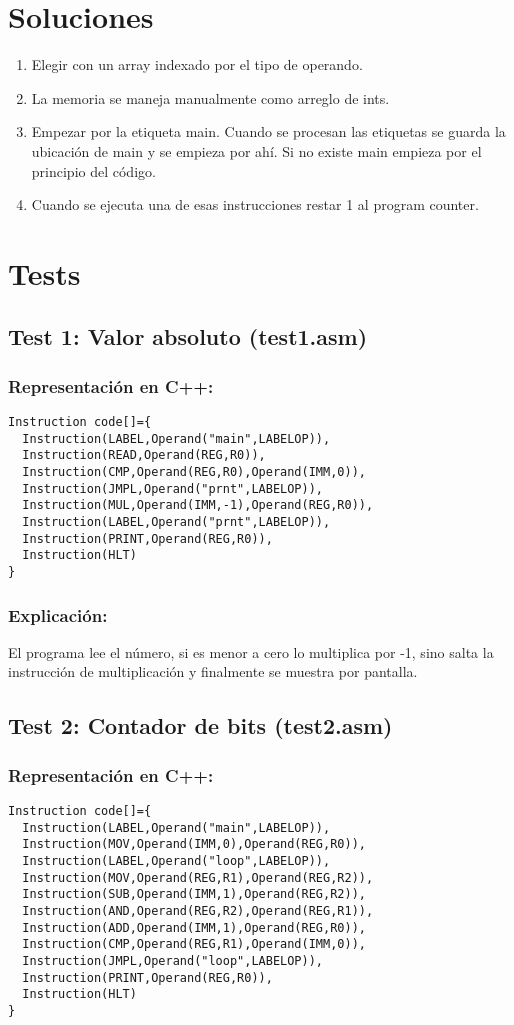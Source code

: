 \documentclass[12pt]{article}
\begin{document}
\section*{Soluciones}
\begin{enumerate}
\item Elegir con un array indexado por el tipo de operando.
\item La memoria se maneja manualmente como arreglo de ints.
\item Empezar por la etiqueta main. Cuando se procesan las etiquetas se guarda la ubicación de main y se empieza por ahí. Si no existe main empieza por el principio del código.
\item Cuando se ejecuta una de esas instrucciones restar 1 al program counter.  
\end{enumerate}
\section*{Tests}
\subsection*{Test 1: Valor absoluto (test1.asm)}
\subsubsection*{Representación en C++:}
\begin{verbatim}
Instruction code[]={
  Instruction(LABEL,Operand("main",LABELOP)),
  Instruction(READ,Operand(REG,R0)),
  Instruction(CMP,Operand(REG,R0),Operand(IMM,0)),
  Instruction(JMPL,Operand("prnt",LABELOP)),
  Instruction(MUL,Operand(IMM,-1),Operand(REG,R0)),
  Instruction(LABEL,Operand("prnt",LABELOP)),
  Instruction(PRINT,Operand(REG,R0)),
  Instruction(HLT)
}
\end{verbatim}
\subsubsection*{Explicación:}
El programa lee el número, si es menor a cero lo multiplica por -1, sino salta la instrucción de multiplicación y finalmente se muestra por pantalla.
\subsection*{Test 2: Contador de bits (test2.asm)}
\subsubsection*{Representación en C++:}
\begin{verbatim}
Instruction code[]={
  Instruction(LABEL,Operand("main",LABELOP)),
  Instruction(MOV,Operand(IMM,0),Operand(REG,R0)),
  Instruction(LABEL,Operand("loop",LABELOP)),
  Instruction(MOV,Operand(REG,R1),Operand(REG,R2)),
  Instruction(SUB,Operand(IMM,1),Operand(REG,R2)),
  Instruction(AND,Operand(REG,R2),Operand(REG,R1)),
  Instruction(ADD,Operand(IMM,1),Operand(REG,R0)),
  Instruction(CMP,Operand(REG,R1),Operand(IMM,0)),
  Instruction(JMPL,Operand("loop",LABELOP)),
  Instruction(PRINT,Operand(REG,R0)),
  Instruction(HLT)
}
\end{verbatim}
\end{document}
